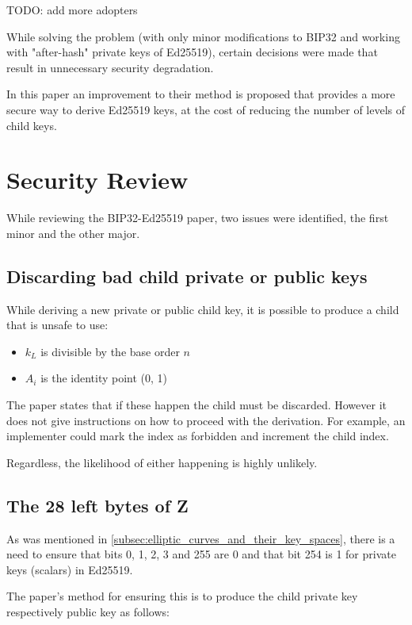 \documentclass[12pt, a4paper, twocolumn]{article}
\begin{document}
TODO: add more adopters

While solving the problem (with only minor modifications to BIP32 and working with "after-hash" private keys of Ed25519), certain decisions were made that result in unnecessary security degradation.

In this paper an improvement to their method is proposed that provides a more secure way to derive Ed25519 keys, at the cost of reducing the number of levels of child keys.


\section{Security Review}

While reviewing the BIP32-Ed25519 paper\cite{BIP32-Ed25519}, two issues were identified, the first minor and the other major.

\subsection{Discarding bad child private or public keys}

While deriving a new private or public child key, it is possible to produce a child that is unsafe to use:

\begin{itemize}
  \item $k_L$ is divisible by the base order $n$
  \item $A_i$ is the identity point (0, 1)
\end{itemize}

The paper states that if these happen the child must be discarded. However it does not give instructions on how to proceed with the derivation. For example, an implementer could mark the index as forbidden and increment the child index.

Regardless, the likelihood of either happening is highly unlikely.

\subsection{The 28 left bytes of Z }

As was mentioned in \ref{subsec:elliptic_curves_and_their_key_spaces}, there is a need to ensure that bits 0, 1, 2, 3 and 255 are 0 and that bit 254 is 1 for private keys (scalars) in Ed25519.

The paper's method for ensuring this is to produce the child private key respectively public key as follows:
\end{document}
